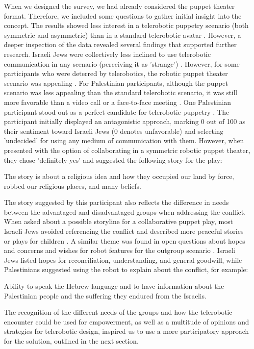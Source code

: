\documentclass[dissertation,math,vertlayout,pdfa,colorlinks]{aaltoseries}
\begin{document}
When we designed the survey, we had already considered the puppet theater format. Therefore, we included some questions to gather initial insight into the concept. The results showed less interest in a telerobotic puppetry scenario (both symmetric and asymmetric) than in a standard telerobotic avatar \cite[p. 10]{peledTeleroboticIntergroupContact2024}. However, a deeper inspection of the data revealed several findings that supported further research. Israeli Jews were collectively less inclined to use telerobotic communication in any scenario (perceiving it as 'strange') \cite[p. 8]{peledTeleroboticIntergroupContact2024}. However, for some participants who were deterred by telerobotics, the robotic puppet theater scenario was appealing \cite[p. 13]{peledTeleroboticIntergroupContact2024}. For Palestinian participants, although the puppet scenario was less appealing than the standard telerobotic scenario, it was still more favorable than a video call or a face-to-face meeting \cite[p. 10]{peledTelerobotContactHypothesis2022}. One Palestinian participant stood out as a perfect candidate for telerobotic puppetry \cite[p. 14]{peledTeleroboticIntergroupContact2024}. The participant initially displayed an antagonistic approach, marking 0 out of 100 as their sentiment toward Israeli Jews (0 denotes unfavorable) and selecting 'undecided' for using any medium of communication with them. However, when presented with the option of collaborating in a symmetric robotic puppet theater, they chose 'definitely yes' and suggested the following story for the play:
\begin{displayquote}
The story is about a religious idea and how they occupied our land by force, robbed our
religious places, and many beliefs.
\end{displayquote}

The story suggested by this participant also reflects the difference in needs between the advantaged and disadvantaged groups when addressing the conflict. When asked about a possible storyline for a collaborative puppet play, most Israeli Jews avoided referencing the conflict and described more peaceful stories or plays for children \cite[p. 14]{peledTeleroboticIntergroupContact2024}. A similar theme was found in open questions about hopes and concerns and wishes for robot features for the outgroup scenario \cite[p. 13]{peledTeleroboticIntergroupContact2024}. Israeli Jews listed hopes for reconciliation, understanding, and general goodwill, while Palestinians suggested using the robot to explain about the conflict, for example:
\begin{displayquote}
Ability to speak the Hebrew language and to have information about the Palestinian
people and the suffering they endured from the Israelis.
\end{displayquote}
The recognition of the different needs of the groups and how the telerobotic encounter could be used for empowerment, as well as a multitude of opinions and strategies for telerobotic design, inspired us to use a more participatory approach for the solution, outlined in the next section.
\end{document}
